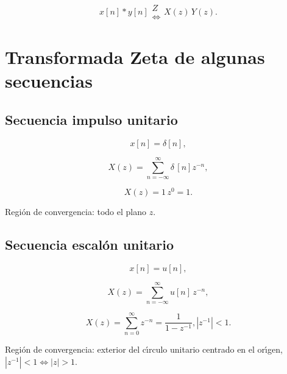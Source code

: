 \begin{equation}
x\left[ n\right] * y\left[ n\right] 
\begin{array}{c}
Z \\ 
\Leftrightarrow
\end{array}
X\left( z\right) \, Y\left( z\right) .
\end{equation}

\section{Transformada Zeta de algunas secuencias}

\subsection{Secuencia impulso unitario}

\begin{equation}
x\left[ n\right] =\delta \left[ n\right] ,
\end{equation}

\begin{equation}
X\left( z\right) = \sum_{n=-\infty }^{\infty } \delta \, \left[ n\right] z^{-n},
\end{equation}

\begin{equation}
X\left( z\right) = 1 \, z^{0} = 1.
\end{equation}

Regi\'{o}n de convergencia: todo el plano $z$.

\subsection{Secuencia escal\'{o}n unitario}

\begin{equation}
x\left[ n\right] =u\left[ n\right] ,
\end{equation}

\begin{equation}
X\left( z\right) =\sum_{n=-\infty }^{\infty }u\left[ n\right] \, z^{-n},
\end{equation}

\begin{equation}
X\left( z\right) =\sum_{n=0}^{\infty }z^{-n}=\frac{1}{1-z^{-1}}, \left| z^{-1}\right| <1.
\end{equation}

Regi\'{o}n de convergencia: exterior del c\'{\i}rculo unitario centrado en el
or\'{\i}gen, $\left| z^{-1}\right| <1\Leftrightarrow \left| z\right| >1$.

